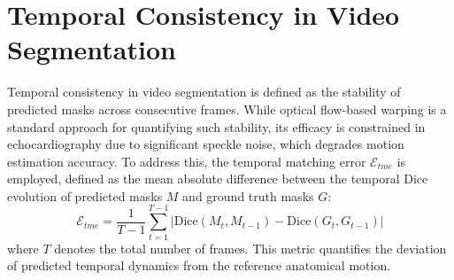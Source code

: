\section{Temporal Consistency in Video Segmentation}
\label{sec:temporal_consistency}

\noindent 
Temporal consistency in video segmentation is defined as the stability of predicted masks across consecutive frames.
While optical flow-based warping is a standard approach for quantifying such stability, its efficacy is constrained in echocardiography due to significant speckle noise, which degrades motion estimation accuracy.
To address this, the temporal matching error $\mathcal{E}_{tme}$ is employed, defined as the mean absolute difference between the temporal Dice evolution of predicted masks $M$ and ground truth masks $G$:
\begin{equation}
    \mathcal{E}_{tme} = \frac{1}{T-1} \sum_{t=1}^{T-1} \left| \text{Dice}(M_t, M_{t-1}) - \text{Dice}(G_t, G_{t-1}) \right|
    \label{eq:tme}
\end{equation}
where $T$ denotes the total number of frames.
This metric quantifies the deviation of predicted temporal dynamics from the reference anatomical motion.
